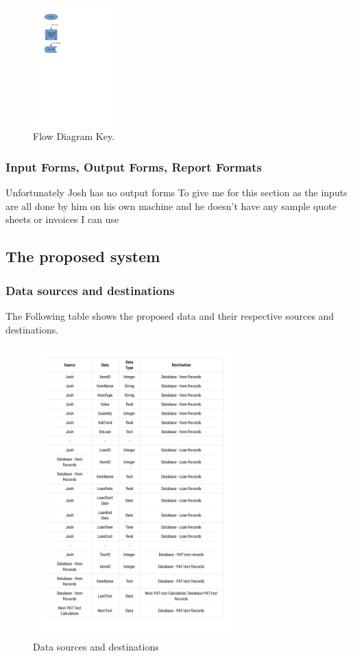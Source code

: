 \documentclass[a4paper,12pt]{report}
\begin{document}
\begin{figure}[H]
    \caption{Flow Diagram Key.} \label{fig:print_function_result}
    \centerline{\includegraphics[width=125px]{./Dataflow/DFD_analysis_update_item.pdf}}
\end{figure}

\newpage

\subsubsection{Input Forms, Output Forms, Report Formats}

Unfortunately Josh has no output forms To give me for this section as the inputs are all done by him on his own machine and he doesn't have any sample quote sheets or invoices I can use\\

\newpage

\subsection{The proposed system}

\subsubsection{Data sources and destinations}

The Following table shows the proposed data and their respective sources and destinations.

\begin{figure}[H]
    \caption{Data sources and destinations} \label{fig: Data sources and destinations}
    \centerline{\includegraphics[page=1,width=300px]{./DataS&D/Data_S&D.pdf}}
\end{figure}
\end{document}
